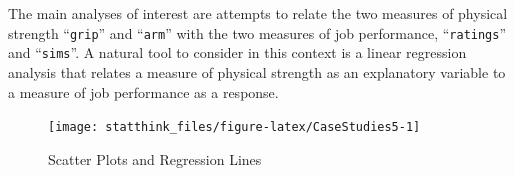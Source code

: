 \documentclass[
]{krantz}
\makeatletter
\newenvironment{Shaded}{\begin{snugshade}}{\end{snugshade}}
\newcommand{\CommentTok}[1]{\textcolor[rgb]{0.56,0.35,0.01}{\textit{#1}}}
\newcommand{\DataTypeTok}[1]{\textcolor[rgb]{0.13,0.29,0.53}{#1}}
\newcommand{\DecValTok}[1]{\textcolor[rgb]{0.00,0.00,0.81}{#1}}
\newcommand{\FloatTok}[1]{\textcolor[rgb]{0.00,0.00,0.81}{#1}}
\newcommand{\KeywordTok}[1]{\textcolor[rgb]{0.13,0.29,0.53}{\textbf{#1}}}
\newcommand{\NormalTok}[1]{#1}
\newcommand{\OperatorTok}[1]{\textcolor[rgb]{0.81,0.36,0.00}{\textbf{#1}}}
\newcommand{\StringTok}[1]{\textcolor[rgb]{0.31,0.60,0.02}{#1}}
\newenvironment{kframe}{%
\medskip{}
\setlength{\fboxsep}{.8em}
 \def\at@end@of@kframe{}%
 \ifinner\ifhmode%
  \def\at@end@of@kframe{\end{minipage}}%
  \begin{minipage}{\columnwidth}%
 \fi\fi%
 \def\FrameCommand##1{\hskip\@totalleftmargin \hskip-\fboxsep
 \colorbox{shadecolor}{##1}\hskip-\fboxsep
     \hskip-\linewidth \hskip-\@totalleftmargin \hskip\columnwidth}%
 \MakeFramed {\advance\hsize-\width
   \@totalleftmargin\z@ \linewidth\hsize
   \@setminipage}}%
 {\par\unskip\endMakeFramed%
 \at@end@of@kframe}
\renewenvironment{Shaded}{\begin{kframe}}{\end{kframe}}
\theoremstyle{definition}
\theoremstyle{definition}
\theoremstyle{definition}
\theoremstyle{remark}
\makeatother
\begin{document}
The main analyses of interest are attempts to relate the two measures of
physical strength ``\texttt{grip}'' and ``\texttt{arm}'' with the two measures of job
performance, ``\texttt{ratings}'' and ``\texttt{sims}''. A natural tool to consider in
this context is a linear regression analysis that relates a measure of
physical strength as an explanatory variable to a measure of job
performance as a response.

\begin{Shaded}
\end{Shaded}

\begin{figure}

{\centering \texttt{[image: statthink\_files/figure-latex/CaseStudies5-1]} 

}

\caption{Scatter Plots and Regression Lines}\label{fig:CaseStudies5}
\end{figure}
\end{document}
